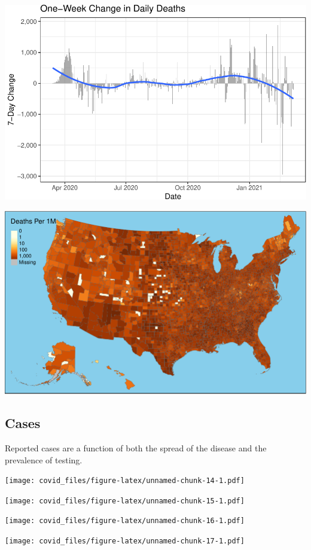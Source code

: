 \documentclass[]{article}
\begin{document}
\includegraphics{covid_files/figure-latex/unnamed-chunk-12-1.pdf}

\includegraphics{covid_files/figure-latex/unnamed-chunk-13-1.pdf}

\newpage

\hypertarget{cases}{%
\subsection{Cases}\label{cases}}

Reported cases are a function of both the spread of the disease and the
prevalence of testing.

\texttt{[image: covid\_files/figure-latex/unnamed-chunk-14-1.pdf]}

\texttt{[image: covid\_files/figure-latex/unnamed-chunk-15-1.pdf]}

\texttt{[image: covid\_files/figure-latex/unnamed-chunk-16-1.pdf]}

\texttt{[image: covid\_files/figure-latex/unnamed-chunk-17-1.pdf]}
\end{document}
